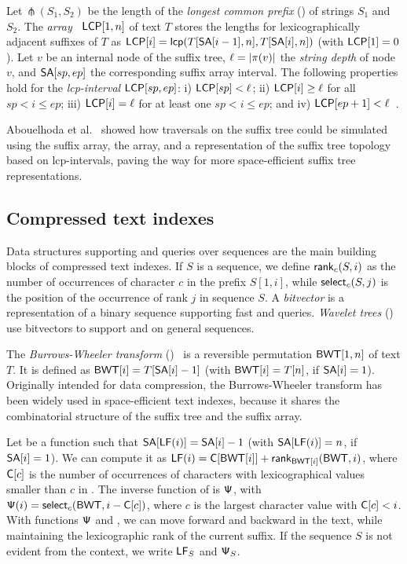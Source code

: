 Let $\mlcp(S_{1}, S_{2})$ be the length of the \emph{longest common prefix}
(\LCP) of strings $S_{1}$ and $S_{2}$. The \LCP{}
\emph{array}~\cite{Manber1993} $\mathsf{LCP}[1,n]$ of text $T$ stores the \LCP{}
lengths for lexicographically adjacent suffixes of $T$ as $\mathsf{LCP}[i] =
\mathsf{lcp}(T[\mathsf{SA}[i-1],n], T[\mathsf{SA}[i],n])$ (with $\mathsf{LCP}[1] = 0$). Let $v$ be an internal node of the
suffix tree, $\ell = \lvert \pi(v) \rvert$ the \emph{string depth} of node $v$, and
$\mathsf{SA}[sp,ep]$ the corresponding suffix array interval. The following
properties hold for the \emph{lcp-interval} $\mathsf{LCP}[sp,ep]$: i) $\mathsf{LCP}[sp] <
\ell$; ii) $\mathsf{LCP}[i] \ge \ell$ for all $sp < i \le ep$; iii) $\mathsf{LCP}[i] = \ell$
for at least one $sp < i \le ep$; and iv) $\mathsf{LCP}[ep+1] <
\ell$~\cite{Abouelhoda2004}.

Abouelhoda et al.~\cite{Abouelhoda2004} showed how traversals on the suffix
tree could be simulated using the suffix array, the \LCP{} array, and a
representation of the suffix tree topology based on lcp-intervals, paving
the way for more space-efficient suffix tree representations.

\subsection{Compressed text indexes}

Data structures supporting \rank{} and \select{} queries over sequences are
the main building blocks of compressed text indexes. If $S$ is a sequence, we
define $\mathsf{rank}_{c}(S,i)$ as the number of occurrences of character $c$ in
the prefix $S[1,i]$, while $\mathsf{select}_{c}(S,j)$ is the position of the occurrence
of rank $j$ in sequence $S$. A \emph{bitvector} is a representation of a
binary sequence supporting fast \rank{} and \select{} queries.
\emph{Wavelet trees} (\WT)~\cite{Grossi2003} use bitvectors to support \rank{}
and \select{} on general sequences.

The \emph{Burrows-Wheeler transform} (\BWT)~\cite{Burrows1994} is a reversible
permutation $\mathsf{BWT}[1,n]$ of text $T$. It is defined as $\mathsf{BWT}[i] = T[\mathsf{SA}[i] -
1]$ (with $\mathsf{BWT}[i] = T[n]$, if $\textsf{SA}[i] = 1$). Originally intended for data
compression, the Burrows-Wheeler transform has been widely used in
space-efficient text indexes, because it shares the combinatorial structure of
the suffix tree and the suffix array.

Let \LF{} be a function such that $\mathsf{SA}[\mathsf{LF}(i)] = \mathsf{SA}[i] - 1$ (with
$\mathsf{SA}[\mathsf{LF}(i)] = n$, if $\mathsf{SA}[i] = 1$). We can compute it as $\mathsf{LF}(i) =
\mathsf{C}[\mathsf{BWT}[i]] + \mathsf{rank}_{\mathsf{BWT}[i]}(\mathsf{BWT}, i)$, where $\mathsf{C}[c]$ is the number of
occurrences of characters with lexicographical values smaller than $c$ in
\BWT. The inverse function of \LF{} is $\mathsf{\Psi}$, with $\mathsf{\Psi}(i) =
\mathsf{select}_{c}(\mathsf{BWT}, i - \mathsf{C}[c])$, where $c$ is the largest character value
with $\mathsf{C}[c] < i$. With functions $\mathsf{\Psi}$ and \LF, we can move forward and
backward in the text, while maintaining the lexicographic rank of the current
suffix. If the sequence $S$ is not evident from the context, we write $\mathsf{LF}_{S}$
and $\mathsf{\Psi}_{S}$.


